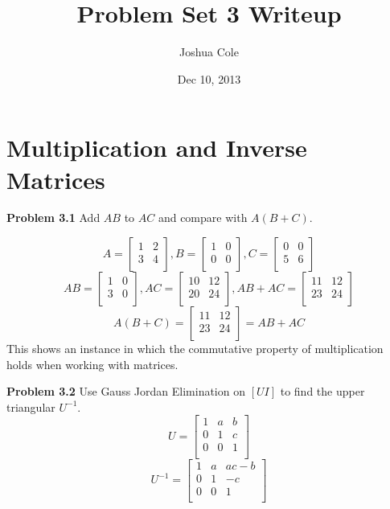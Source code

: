 \documentclass {article}
\begin{document}
\title {Problem Set 3 Writeup}
\author {Joshua Cole}
\date {Dec 10, 2013}
\maketitle
\section {Multiplication and Inverse Matrices}



\textbf{Problem 3.1} Add $AB$ to $AC$ and compare with $A(B+C)$.

$$
A = 
 \begin{bmatrix}
    1 & 2\\
    3 & 4\\
\end{bmatrix}, 
B =
 \begin{bmatrix}
    1 & 0\\
    0 & 0\\
\end{bmatrix}, 
C =
 \begin{bmatrix}
    0 & 0\\
    5 & 6\\
\end{bmatrix}
$$
$$
AB = 
\begin{bmatrix}
    1 & 0\\
    3 & 0\\
\end{bmatrix},
AC = 
\begin{bmatrix}
    10 & 12\\
    20 & 24\\
\end{bmatrix},
AB + AC =
\begin{bmatrix}
    11 & 12\\
    23 & 24\\
\end{bmatrix}
$$
$$
A(B + C) =
\begin{bmatrix}
    11 & 12\\
    23 & 24\\
\end{bmatrix} =
AB + AC
$$
This shows an instance in which the commutative property of multiplication holds when working with matrices.

\textbf{Problem 3.2} Use Gauss Jordan Elimination on $[U I]$ to find the upper triangular $U^{-1}$.
$$
U = 
\begin{bmatrix}
    1 & a & b\\
    0 & 1 & c\\
    0 & 0 & 1\\
\end{bmatrix}
$$
$$
U^{-1} = 
\begin{bmatrix}
    1 & a & ac-b\\
    0 & 1 & -c\\
    0 & 0 & 1\\
\end{bmatrix}
$$
\end{document}
